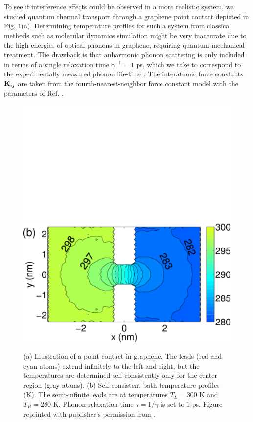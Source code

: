 To see if interference effects could be observed in a more realistic system, we studied quantum thermal transport through a graphene point contact depicted in Fig. \ref{fig:gf_fig8}(a). Determining temperature profiles for such a system from classical methods such as molecular dynamics simulation might be very inaccurate due to the high energies of optical phonons in graphene, requiring quantum-mechanical treatment. The drawback is that anharmonic phonon scattering is only included in terms of a single relaxation time $\gamma^{-1}=1$ ps, which we take to correspond to the experimentally measured phonon life-time \cite{bonini12}. The interatomic force constants $\mathbf{K}_{ij}$ are taken from the fourth-nearest-neighbor force constant model \cite{saito} with the parameters of Ref. \cite{wirtz04}. %

\begin{figure}
 \begin{center}
 \includegraphics[width=.49\columnwidth]{pics/gf_fig8a.pdf}
 \includegraphics[width=.49\columnwidth]{pics/gf_fig8b.pdf}
 \end{center}
 \caption{(a) Illustration of a point contact in graphene. The leads (red and cyan atoms) extend infinitely to the left and right, but the temperatures are determined self-consistently only for the center region (gray atoms). (b) Self-consistent bath temperature profiles (K). The semi-infinite leads are at temperatures $T_L=300$ K and $T_R=280$ K. Phonon relaxation time $\tau=1/\gamma$ is set to $1$ ps. Figure reprinted with publisher's permission from .}
 \label{fig:gf_fig8}
\end{figure}

